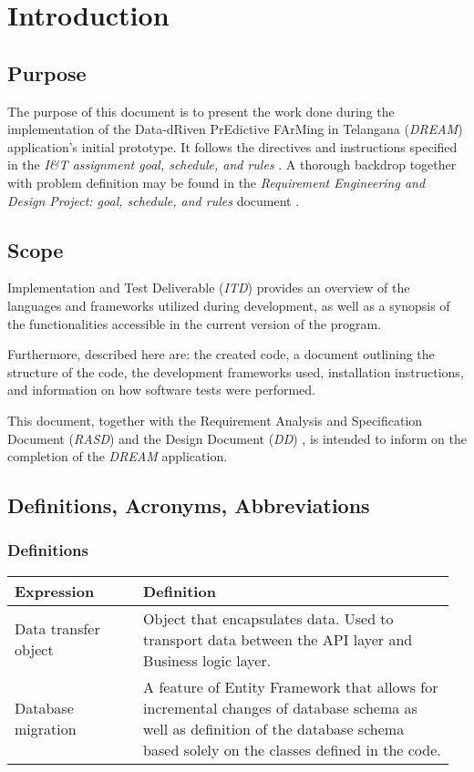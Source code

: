 \chapter{Introduction}

\section{Purpose}

The purpose of this document is to present the work done during the implementation of the Data-dRiven PrEdictive FArMing in Telangana (\textit{DREAM}) application's initial prototype. It follows the directives and instructions specified in the \textit{I\&T assignment goal, schedule, and rules} \cite{reference_doc2}. A thorough backdrop together with problem definition may be found in the \textit{Requirement Engineering and Design Project: goal, schedule, and rules} document \cite{reference_doc}.

\section{Scope}

Implementation and Test Deliverable (\textit{ITD}) provides an overview of the languages and frameworks utilized during development, as well as a synopsis of the functionalities accessible in the current version of the program.

Furthermore, described here are: the created code, a document outlining the structure of the code, the development frameworks used, installation instructions, and information on how software tests were performed.

This document, together with the Requirement Analysis and Specification Document (\textit{RASD}) \cite{rasd} and the Design Document (\textit{DD}) \cite{dd}, is intended to inform on the completion of the \textit{DREAM} application.

\section{Definitions, Acronyms, Abbreviations}

\subsection{Definitions}

\begin{center}
    \begin{longtable}{@{}p{0.28\linewidth} p{0.68\linewidth}@{}}
		\toprule
		\textbf{Expression}     & \textbf{Definition}\\
		
		\midrule
        Data transfer object & Object that encapsulates data. Used to transport data between the API layer and Business logic layer. \\
        Database migration & A feature of Entity Framework that allows for incremental changes of database schema as well as definition of the database schema based solely on the classes defined in the code. \\
	\end{longtable}
\end{center}


